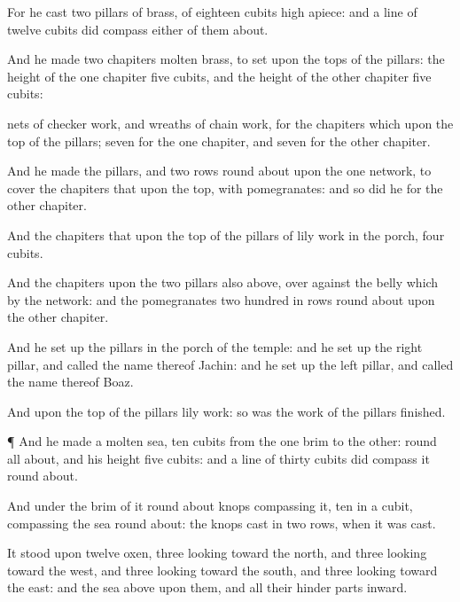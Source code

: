 {For he
cast
two
pillars of
brass, of
eighteen
cubits
high
apiece: and a
line of
twelve
cubits did
compass
either of them
about.

And he
made
two
chapiters
{}
molten
brass, to
set upon the
tops of the
pillars: the
height of the
one
chapiter
{}
five
cubits, and the
height of the
other
chapiter
{}
five
cubits:

nets of
checker
work, and
wreaths of
chain
work, for the
chapiters which
{} upon the
top of the
pillars;
seven for the
one
chapiter, and
seven for the
other
chapiter.

And he
made the
pillars, and
two
rows round
about upon the
one
network, to
cover the
chapiters that
{} upon the
top, with
pomegranates: and so
did he for the
other
chapiter.

And the
chapiters that
{} upon the
top of the
pillars
{} of
lily
work in the
porch,
four
cubits.

And the
chapiters upon the
two
pillars
{} also
above, over
against the
belly which
{}
by the
network: and the
pomegranates
{} two
hundred in
rows round
about upon the
other
chapiter.

And he set
up the
pillars in the
porch of the
temple: and he set
up the
right
pillar, and
called the
name thereof
Jachin: and he set
up the
left
pillar, and
called the
name thereof
Boaz.

And upon the
top of the
pillars
{}
lily
work: so was the
work of the
pillars
finished.


\par }{\PP {}¶ And he
made a
molten
sea,
ten
cubits from the one
brim to the
other:
{}
round all
about, and his
height
{}
five
cubits: and a
line of
thirty
cubits did
compass it round
about.

And under the
brim of it round
about
{}
knops
compassing it,
ten in a
cubit,
compassing the
sea round
about: the
knops
{}
cast in
two
rows, when it was
cast.

It
stood upon
twelve
oxen,
three
looking toward the
north, and
three
looking toward the
west, and
three
looking toward the
south, and
three
looking toward the
east: and the
sea
{}
above upon them, and all their hinder
parts
{}
inward.

}
